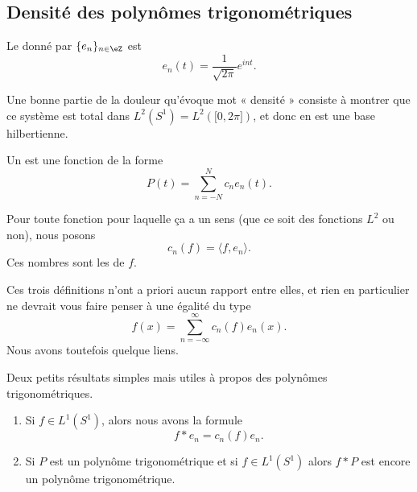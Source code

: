 \subsection{Densité des polynômes trigonométriques}

\begin{definition}      \label{DEFooGCZAooFecAHB}
    Le  donné par \( \{ e_n \}_{n\in \eZ}\) est
    \begin{equation}
        e_n(t)= \frac{1}{ \sqrt{ 2\pi } } e^{int}.
    \end{equation}
\end{definition}

Une bonne partie de la douleur qu'évoque mot « densité » consiste à montrer que ce système est total dans \( L^2(S^1)=L^2(\mathopen[ 0 , 2\pi \mathclose])\), et donc en est une base hilbertienne.

\begin{definition}
    Un  est une fonction de la forme
    \begin{equation}
        P(t)=\sum_{n=-N}^Nc_n e_n(t).
    \end{equation}
\end{definition}

\begin{definition}
    Pour toute fonction pour laquelle ça a un sens (que ce soit des fonctions \( L^2\) ou non), nous posons
    \begin{equation}\label{EqhIPoPH}
        c_n(f)=\langle f, e_n\rangle .
    \end{equation}
    Ces nombres sont les  de \( f\). 
\end{definition}

Ces trois définitions n'ont a priori aucun rapport entre elles, et rien en particulier ne devrait vous faire penser à une égalité du type
\begin{equation}
    f(x)=\sum_{n=-\infty}^{\infty}c_n(f)e_n(x).
\end{equation}
Nous avons toutefois quelque liens.

\begin{lemma}   \label{LemZVfZlms}
    Deux petits résultats simples mais utiles à propos des polynômes trigonométriques.
    \begin{enumerate}
        \item
    Si \( f\in L^1(S^1)\), alors nous avons la formule
    \begin{equation}
        f*e_n=c_n(f)e_n.
    \end{equation}
\item

    Si \( P\) est un polynôme trigonométrique et si \( f\in L^1(S^1)\) alors \( f*P\) est encore un polynôme trigonométrique.
    \end{enumerate}
\end{lemma}

